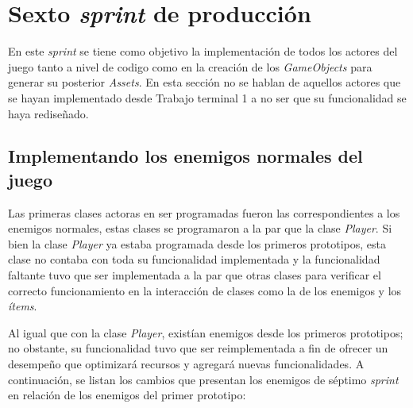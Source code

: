 \section{Sexto \textit{sprint} de producción}
En este \textit{sprint} se tiene como objetivo la implementación de todos los 
actores del juego tanto a nivel de codigo como en la creación de los 
\textit{GameObjects} para generar su posterior \textit{Assets}. En esta sección 
no se hablan de aquellos actores que se hayan implementado desde Trabajo terminal 
1 a no ser que su funcionalidad se haya rediseñado.

\subsection{Implementando los enemigos normales del juego} 
Las primeras clases actoras en ser programadas fueron las correspondientes a los 
enemigos normales, estas clases se programaron a la par que la clase \textit{Player}. 
Si bien la clase \textit{Player} ya estaba programada desde los primeros prototipos, 
esta clase no contaba con toda su funcionalidad implementada y la funcionalidad 
faltante tuvo que ser implementada a la par que otras clases para verificar el 
correcto funcionamiento en la interacción de clases como la de los enemigos y los 
\textit{ítems}.
\\
\par 
Al igual que con la clase \textit{Player},  existían enemigos desde los primeros prototipos; no obstante, 
su funcionalidad tuvo que ser reimplementada a fin de ofrecer un desempeño que 
optimizará recursos y agregará nuevas funcionalidades. A continuación, se listan los 
cambios que presentan los enemigos de séptimo \textit{sprint} en relación de los 
enemigos del primer prototipo: 

